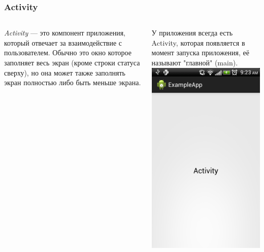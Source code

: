 \begin{frame}[fragile]
	\frametitle{Activity}
	
	\begin{columns}[c]
	\column{2.45in}
	\emph{Activity} --- это компонент приложения, который отвечает за взаимодействие с пользователем. Обычно это окно которое заполняет весь экран (кроме строки статуса сверху), но она может также заполнять экран полностью либо быть меньше экрана.

	\medskip
	У приложения всегда есть Activity, которая появляется в момент запуска приложения, её называют "главной" (main).
	\column{2.0in}
	\includegraphics[scale=0.25]{2013-04-25_09-23-28.png}
	\end{columns}
\end{frame}

